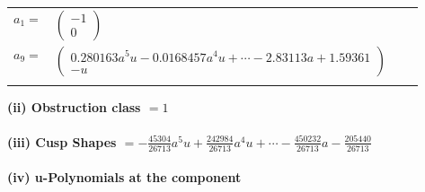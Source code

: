 \documentclass[1p]{elsarticle_modified}
\theoremstyle{definition}
\begin{document}
\begin{tabular}{m{7pt} m{180pt} m{7pt} m{180pt} }
\flushright $a_{1}=$&$\begin{pmatrix}-1\\0\end{pmatrix}$ \\
\flushright $a_{9}=$&$\begin{pmatrix}0.280163 a^{5} u-0.0168457 a^{4} u+\cdots-2.83113 a+1.59361\\- u\end{pmatrix}$\\&\end{tabular}
\flushleft \textbf{(ii) Obstruction class $= 1$}\\~\\
\flushleft \textbf{(iii) Cusp Shapes $= -\frac{45304}{26713} a^5 u+\frac{242984}{26713} a^4 u+\cdots-\frac{450232}{26713} a-\frac{205440}{26713}$}\\~\\
\newpage\renewcommand{\arraystretch}{1}
\flushleft \textbf{(iv) u-Polynomials at the component}\newline \\
\end{document}
